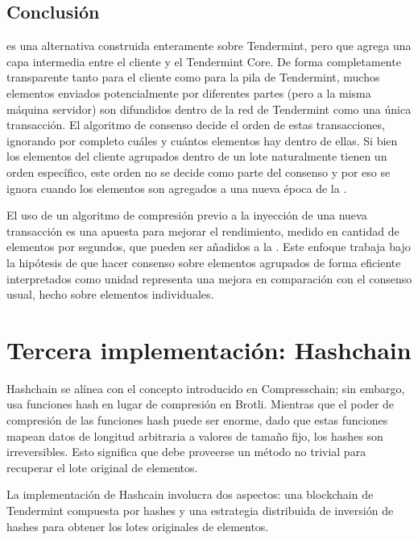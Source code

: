 \subsection{Conclusión}
\compresschain es una alternativa construida enteramente sobre Tendermint, pero que agrega una capa
intermedia entre el cliente y el Tendermint Core.
De forma completamente transparente tanto para el
cliente como para la pila de Tendermint, muchos elementos enviados potencialmente por diferentes partes
(pero a la misma máquina servidor)
son difundidos dentro de la red de Tendermint como una única transacción.
El algoritmo de consenso
decide el orden de estas transacciones, ignorando por completo cuáles y cuántos elementos hay dentro de ellas.
Si bien los elementos del cliente agrupados dentro de un lote naturalmente tienen un orden específico,
este orden no se decide como parte del consenso y por eso se ignora cuando los elementos son agregados
a una nueva época de la \setchain.

%
El uso de un algoritmo de compresión previo a la inyección de una nueva transacción es una apuesta para mejorar
el rendimiento, medido en cantidad de elementos por segundos, que pueden ser añadidos a la \setchain.
Este enfoque trabaja bajo la hipótesis de que hacer consenso sobre elementos agrupados de forma
eficiente interpretados como unidad representa una mejora en comparación con el consenso usual,
hecho sobre elementos individuales.

\section{Tercera implementación: Hashchain}\label{sec:hashchain}
%
Hashchain se alínea con el concepto introducido en Compresschain; sin embargo, usa
funciones hash en lugar de compresión en Brotli.
%
Mientras que el poder de compresión de las funciones hash puede ser enorme, dado que estas funciones
mapean datos de longitud arbitraria a valores de tamaño fijo, los hashes son irreversibles.
%
Esto significa que debe proveerse un método no trivial para recuperar el lote original de elementos.

La implementación de Hashcain involucra dos aspectos: una blockchain de Tendermint compuesta por hashes
y una estrategia distribuida de inversión de hashes para obtener los lotes originales de elementos.
%

